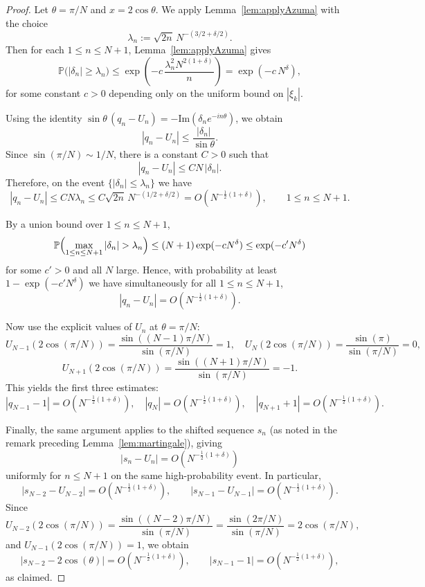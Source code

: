 \documentclass[10pt,a4paper]{amsart}
\begin{document}
\begin{proof}
Let $\theta=\pi/N$ and $x=2\cos\theta$.  We apply Lemma~\ref{lem:applyAzuma} with the choice
\[
\lambda_n := \sqrt{2n}\,N^{-(3/2+\delta/2)} .
\]
Then for each $1\le n\le N+1$, Lemma~\ref{lem:applyAzuma} gives
\[
\mathbb{P}\bigl(|\delta_n|\ge \lambda_n\bigr)
\le
\exp\!\left(-c\,\frac{\lambda_n^2 N^{2(1+\delta)}}{n}\right)
=
\exp\!\left(-c\,N^{\delta}\right),
\]
for some constant $c>0$ depending only on the uniform bound on $|\xi_k|$.

Using the identity $\sin\theta\,(q_n-U_n)=-\textrm{Im}(\delta_n e^{-in\theta})$, we obtain
\[
|q_n-U_n|\le \frac{|\delta_n|}{\sin\theta}.
\]
Since $\sin(\pi/N)\sim 1/N$, there is a constant $C>0$ such that
\[
|q_n-U_n|\le C N\,|\delta_n|.
\]
Therefore, on the event $\{|\delta_n|\le \lambda_n\}$ we have
\[
|q_n-U_n|\le C N \lambda_n
\le C \sqrt{2n}\,N^{-(1/2+\delta/2)}
=O\!\left(N^{-\frac12(1+\delta)}\right),
\qquad 1\le n\le N+1.
\]

By a union bound over $1\le n\le N+1$,
\[
\mathbb{P}\Bigl(\max_{1\le n\le N+1}|\delta_n|>\lambda_n\Bigr)
\le (N+1)\exp(-cN^\delta)
\le \exp(-c' N^\delta)
\]
for some $c'>0$ and all $N$ large. Hence, with probability at least
$1-\exp(-c' N^\delta)$ we have simultaneously for all $1\le n\le N+1$,
\[
|q_n-U_n| = O\!\left(N^{-\frac12(1+\delta)}\right).
\]

Now use the explicit values of $U_n$ at $\theta=\pi/N$:
\[
U_{N-1}(2\cos(\pi/N))=\frac{\sin((N-1)\pi/N)}{\sin(\pi/N)}=1,\quad
U_N(2\cos(\pi/N))=\frac{\sin(\pi)}{\sin(\pi/N)}=0,
\]
\[
U_{N+1}(2\cos(\pi/N))=\frac{\sin((N+1)\pi/N)}{\sin(\pi/N)}=-1.
\]
This yields the first three estimates:
\[
|q_{N-1}-1|=O\!\left(N^{-\frac12(1+\delta)}\right),\quad
|q_N|=O\!\left(N^{-\frac12(1+\delta)}\right),\quad
|q_{N+1}+1|=O\!\left(N^{-\frac12(1+\delta)}\right).
\]

Finally, the same argument applies to the shifted sequence $s_n$ (as noted in the remark preceding Lemma~\ref{lem:martingale}), giving
\[
|s_n-U_n|=O\!\left(N^{-\frac12(1+\delta)}\right)
\]
uniformly for $n\le N+1$ on the same high-probability event. In particular,
\[
|s_{N-2}-U_{N-2}|=O\!\left(N^{-\frac12(1+\delta)}\right),\qquad
|s_{N-1}-U_{N-1}|=O\!\left(N^{-\frac12(1+\delta)}\right).
\]
Since
\[
U_{N-2}(2\cos(\pi/N))
=\frac{\sin((N-2)\pi/N)}{\sin(\pi/N)}
=\frac{\sin(2\pi/N)}{\sin(\pi/N)}=2\cos(\pi/N),
\]
and $U_{N-1}(2\cos(\pi/N))=1$, we obtain
\[
|s_{N-2}-2\cos(\theta)|=O\!\left(N^{-\frac12(1+\delta)}\right),\qquad
|s_{N-1}-1|=O\!\left(N^{-\frac12(1+\delta)}\right),
\]
as claimed.
\end{proof}
\end{document}
